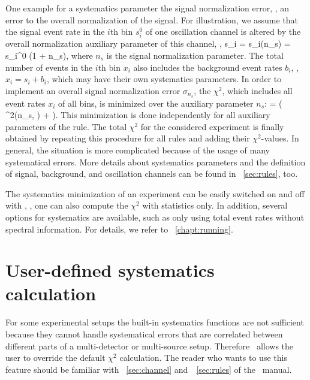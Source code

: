  One example for a systematics parameter the signal normalization error, \ie, an error to the overall normalization of the signal. For illustration, we assume that the signal event rate in the $i$th bin $s_i^0$ of one oscillation channel is altered by the overall normalization auxiliary parameter of this channel, \ie , 
\be
 s_i = s_i(n_s) = s_i^0 \cdot (1 + n_s),
\ee
where $n_s$ is the signal normalization parameter. The total number of events in the $i$th bin $x_i$ also includes the background event rates $b_i$, \ie, $x_i = s_i + b_i$, which may have their own systematics parameters.
In order to implement an overall signal normalization error $\sigma_{n_s}$,  the $\chi^2$, which includes all event rates $x_i$ of all bins, is minimized over the auxiliary parameter $n_s$:
\be
  =  \left(  \chi^2(n_s, \hdots) +  \right).
\ee 
This minimization is done independently for all auxiliary parameters of the rule. The total $\chi^2$ for the considered experiment is finally obtained by repeating this procedure for all rules and adding their $\chi^2$-values. In general, the situation is more complicated because of the usage of many systematical errors. More details about systematics parameters and the definition of signal, background, and oscillation channels can be found in \Sec~\ref{sec:rules}, too.

The systematics minimization of an experiment can be easily switched on and off with , \ie, one can also compute the $\chi^2$ with statistics only. In addition, several options for 
systematics are available, such as only using total event rates without
spectral information. For details, we refer to \Chapt~\ref{chapt:running}.


\section{User-defined systematics calculation}
\label{sec:userchi}

For some experimental setups the built-in systematics functions are not sufficient
because they cannot handle systematical errors that are correlated between different
parts of a multi-detector or multi-source setup. Therefore \GLOBES\ allows the user
to override the default $\chi^2$ calculation. The reader who wants to use this
feature should be familiar with \Sec~\ref{sec:channel} and~\Sec~\ref{sec:rules}
of the \AEDL\ manual.

